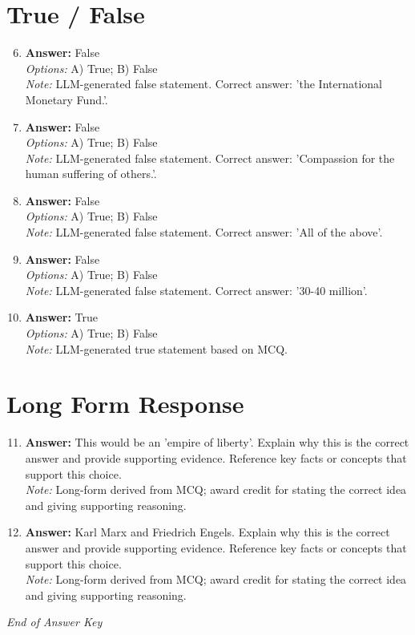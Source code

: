 \documentclass[12pt]{article}
\begin{document}
\section*{True / False}
\begin{enumerate}[label=\arabic*.]
\setcounter{enumi}{5}
\item \textbf{Answer:} False
\\ \textit{Options:} A) True; B) False
\\ \textit{Note:} LLM-generated false statement. Correct answer: 'the International Monetary Fund.'.
\item \textbf{Answer:} False
\\ \textit{Options:} A) True; B) False
\\ \textit{Note:} LLM-generated false statement. Correct answer: 'Compassion for the human suffering of others.'.
\item \textbf{Answer:} False
\\ \textit{Options:} A) True; B) False
\\ \textit{Note:} LLM-generated false statement. Correct answer: 'All of the above'.
\item \textbf{Answer:} False
\\ \textit{Options:} A) True; B) False
\\ \textit{Note:} LLM-generated false statement. Correct answer: '30-40 million'.
\item \textbf{Answer:} True
\\ \textit{Options:} A) True; B) False
\\ \textit{Note:} LLM-generated true statement based on MCQ.
\end{enumerate}

\section*{Long Form Response}
\begin{enumerate}[label=\arabic*.]
\setcounter{enumi}{10}
\item \textbf{Answer:} This would be an 'empire of liberty'. Explain why this is the correct answer and provide supporting evidence. Reference key facts or concepts that support this choice.
\\ \textit{Note:} Long-form derived from MCQ; award credit for stating the correct idea and giving supporting reasoning.
\item \textbf{Answer:} Karl Marx and Friedrich Engels. Explain why this is the correct answer and provide supporting evidence. Reference key facts or concepts that support this choice.
\\ \textit{Note:} Long-form derived from MCQ; award credit for stating the correct idea and giving supporting reasoning.
\end{enumerate}

\vfill
\noindent\textit{End of Answer Key}
\end{document}
